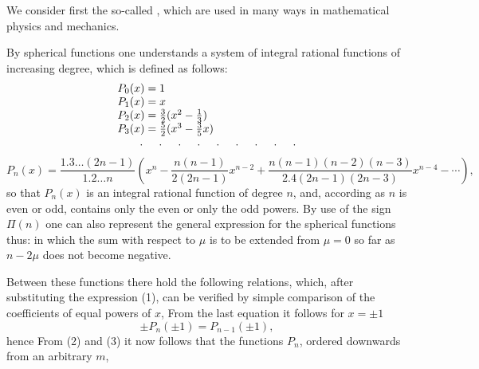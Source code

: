 
We consider first the so-called , which are used
in many ways in mathematical physics and mechanics.

By spherical functions one understands a system of integral rational
functions of increasing degree, which is defined as follows:
\[
\begin{array}{l}
P_0(x) = 1 \\
P_1(x) = x \\
P_2(x) = \frac{3}{2}(x^2 - \frac{1}{3}) \\
P_3(x) = \frac{5}{2}(x^3 - \frac{3}{5}x) \\
\hbox{\quad\quad . \quad . \quad . \quad . \quad . \quad . \quad . \quad . \quad .}
\end{array}
\]
\[
P_n(x) = \frac{1.3 \ldots (2n-1)}{1.2 \ldots n}
\left(x^n - \frac{n(n-1)}{2(2n-1)}x^{n-2}
+ \frac{n(n-1)(n-2)(n-3)}{2.4(2n-1)(2n-3)}x^{n-4} - \cdots\right),
\]
so that $P_n(x)$ is an integral rational function of degree $n$,
and, according as $n$ is even or odd, contains only the even or
only the odd powers. By use of the sign $\Pi(n)$ one can also
represent the general expression for the spherical functions thus:
in which the sum with respect to $\mu$ is to be extended from
$\mu = 0$ so far as $n - 2\mu$ does not become negative.

Between these functions there hold the following relations, which,
after substituting the expression (1), can be verified by simple
comparison of the coefficients of equal powers of $x$,
From the last equation it follows for $x = \pm 1$
\[
\pm P_n(\pm 1) = P_{n-1}(\pm 1),
\]
hence
From (2) and (3) it now follows that the functions $P_n$, ordered
downwards from an arbitrary $m$,
